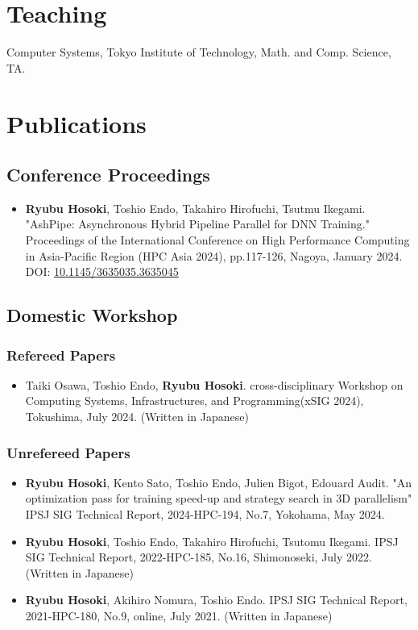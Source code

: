 \documentclass[10pt]{article}
\begin{document}
\section{Teaching}
\begin{description}[align=left,leftmargin=1.2cm,style=multiline]
  \item[2023] Computer Systems, Tokyo Institute of Technology, Math. and Comp. Science, TA.
\end{description}


\section{Publications}
\subsection{Conference Proceedings}
\begin{itemize}[align=left,leftmargin=0.5cm,style=multiline]
  \item {\bf Ryubu Hosoki}, Toshio Endo, Takahiro Hirofuchi, Tsutmu Ikegami. "AshPipe: Asynchronous Hybrid Pipeline Parallel for DNN Training." Proceedings of the International Conference on High Performance Computing in Asia-Pacific Region (HPC Asia 2024), pp.117-126, Nagoya, January 2024. {\small DOI: \href{https://dl.acm.org/doi/10.1145/3635035.3635045}{10.1145/3635035.3635045}}
\end{itemize}


\subsection{Domestic Workshop}
\subsubsection{Refereed Papers}
\begin{itemize}[align=left,leftmargin=0.5cm,style=multiline]
  \item Taiki Osawa, Toshio Endo, {\bf Ryubu Hosoki}. cross-disciplinary Workshop on Computing Systems, Infrastructures, and Programming(xSIG 2024),
  Tokushima, July 2024. (Written in Japanese)
\end{itemize}


\subsubsection{Unrefereed Papers}
\begin{itemize}[align=left,leftmargin=0.5cm,style=multiline]
  \item {\bf Ryubu Hosoki}, Kento Sato, Toshio Endo, Julien Bigot, Edouard Audit. "An optimization pass for training speed-up and strategy search in 3D parallelism" IPSJ SIG Technical Report, 2024-HPC-194, No.7, Yokohama, May 2024.
  \item {\bf Ryubu Hosoki}, Toshio Endo, Takahiro Hirofuchi, Tsutomu Ikegami. IPSJ SIG Technical Report, 2022-HPC-185, No.16, Shimonoseki, July 2022. (Written in Japanese)
  \item {\bf Ryubu Hosoki}, Akihiro Nomura, Toshio Endo. IPSJ SIG Technical Report, 2021-HPC-180, No.9, online, July 2021. (Written in Japanese)
\end{itemize}
\end{document}
